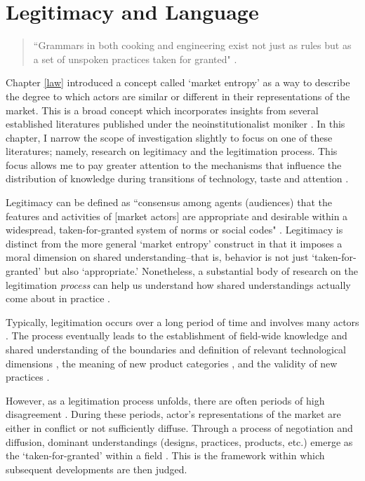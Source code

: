\chapter{Legitimacy and Language\label{lang}}

\begin{small}
\begin{quote}
``Grammars in both cooking and engineering exist not just as rules but as a set of unspoken practices taken for granted" \citep[p. 77]{arthur2009}.
\end{quote}
\end{small}
Chapter \ref{law} introduced a concept called `market entropy' as a way to describe the degree to which actors are similar or different in their representations of the market. This is a broad concept which incorporates insights from several established literatures published under the neoinstitutionalist moniker \citep[e.g.][]{denzau1994, dimaggio1983, loasby1999}. In this chapter, I narrow the scope of investigation slightly to focus on one of these literatures; namely, research on legitimacy and the legitimation process. This focus allows me to pay greater attention to the mechanisms that influence the distribution of knowledge during transitions of technology, taste and attention \citep[e.g.][]{powell2008}.

Legitimacy can be defined as ``consensus among agents (audiences) that the features and activities of [market actors] are appropriate and desirable within a widespread, taken-for-granted system of norms or social codes" \citep[p. 147]{cattani2008}. Legitimacy is distinct from the more general `market entropy' construct in that it imposes a moral dimension on shared understanding--that is, behavior is not just `taken-for-granted' but also `appropriate.' Nonetheless, a substantial body of research on the legitimation \emph{process} can help us understand how shared understandings actually come about in practice \citep{goldberg2012}.

Typically, legitimation occurs over a long period of time and involves many actors \citep{goldberg2012, rosa1999}. The process eventually leads to the establishment of field-wide knowledge and shared understanding of the boundaries and definition of relevant technological dimensions \citep{santos2009}, the meaning of new product categories \citep{rosa1999}, and the validity of new practices \citep{lounsbury2007, tripsas2009}. 

However, as a legitimation process unfolds, there are often periods of high disagreement \citep[e.g.][]{powell2008}. During these periods, actor's representations of the market are either in conflict or not sufficiently diffuse. Through a process of negotiation and diffusion, dominant understandings (designs, practices, products, etc.) emerge as the `taken-for-granted' within a field \citep{cattani2008}. This is the framework within which subsequent developments are then judged.

